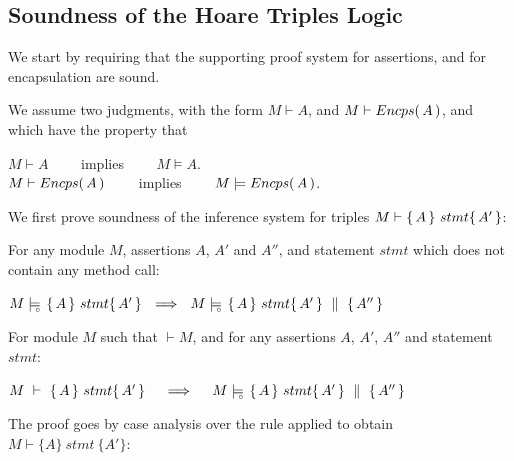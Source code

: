 
\subsection{Soundness of the Hoare Triples Logic}

We start by requiring  that the supporting proof system for assertions, and for encapsulation are sound.
\begin{axiom}
\label{lemma:axiom:enc:assert}
We assume two judgments, with the    form $M \vdash A$,  and $M \vdash {\ensuremath Encps(\, A\, )}$, and which have the property that
\begin{center}
$M \vdash A $ \ \ \ \ implies \ \ \ \ $M \models A$.\\
 $M \vdash {\ensuremath Encps(\, A\, )} $ \ \ \ \ implies \ \ \ \ $M \models {\ensuremath Encps(\, A\, )}$.
 \end{center}
\end{axiom}

\label{sect:prove:triples:sound}
We first prove soundness of the inference system for triples $M \vdash   \{\, A \, \}\ stmt \{\, A' \, \} $:

 
\begin{auxLemma}
\label{l:no:call}
For any module $M$, assertions $A$, $A'$ and $A''$, and statement $stmt$ which does not contain any method call:
\begin{center}
$  \satisfiesD {M} {\triple {A} {stmt} {A'} }  \ \ \Longrightarrow\ \  \satisfiesD {M} {\quadruple {A} {stmt} {A'} {A''}}$
\end{center}
\end{auxLemma}
 


\begin{Theorem}
\label{l:triples:sound}
For module  $M$ %
such that  $\vdash M$, and for any assertions $A$,  $A'$, $A''$ and statement  $stmt$:
\begin{center}
$M\ \vdash\  \triple A {stmt} {A'}  \ \ \ \  \Longrightarrow  \ \ \ \ \satisfiesD {M} {\quadruple {A} {stmt} {A'} {A''}}$
\end{center}
\end{Theorem}
 

\noindent
\vspace{.2cm}
The proof goes by case analysis over the rule applied to obtain $M \vdash \{ A \}\ stmt \  \{ A' \} $:

